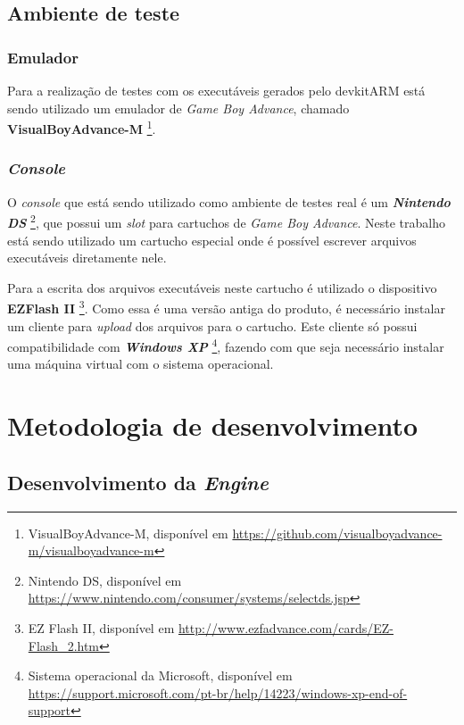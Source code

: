   \subsection{Ambiente de teste}

    \subsubsection{Emulador}

      Para a realização de testes com os executáveis gerados pelo devkitARM está sendo utilizado um emulador de \textit{Game Boy Advance}, chamado \textbf{VisualBoyAdvance-M} \footnote{VisualBoyAdvance-M, disponível em \url{https://github.com/visualboyadvance-m/visualboyadvance-m}}.

    \subsubsection{\textit{Console}}

      O \textit {console} que está sendo utilizado como ambiente de testes real é um \textbf{\textit{Nintendo DS}} \footnote{Nintendo DS, disponível em \url{https://www.nintendo.com/consumer/systems/selectds.jsp}}, que possui um \textit{slot} para cartuchos de \textit{Game Boy Advance}. Neste trabalho está sendo utilizado um cartucho especial onde é possível escrever arquivos executáveis diretamente nele.

      Para a escrita dos arquivos executáveis neste cartucho é utilizado o dispositivo \textbf{EZFlash II} \footnote{EZ Flash II, disponível em \url{http://www.ezfadvance.com/cards/EZ-Flash_2.htm}}. Como essa é uma versão antiga do produto, é necessário instalar um cliente para \textit{upload} dos arquivos para o cartucho. Este cliente só possui compatibilidade com \textit{\textbf{Windows XP}} \footnote{Sistema operacional da Microsoft, disponível em \url{https://support.microsoft.com/pt-br/help/14223/windows-xp-end-of-support}}, fazendo com que seja necessário instalar uma máquina virtual com o sistema operacional.

\section{Metodologia de desenvolvimento}

  \subsection{Desenvolvimento da \textit{Engine}}

